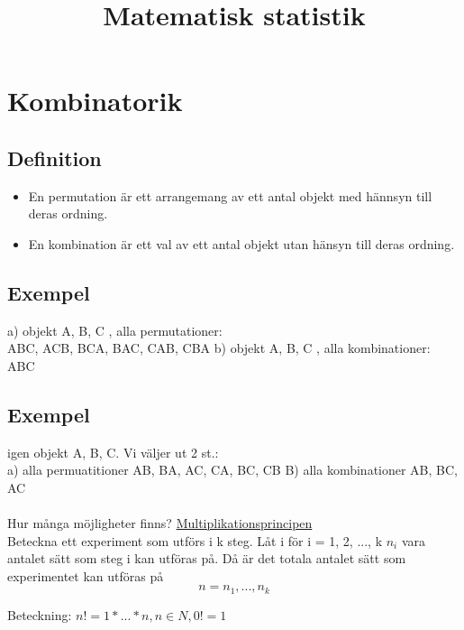 \documentclass{article}
\title{Matematisk statistik}
\begin{document}
\maketitle
\newpage
{}

\section{Kombinatorik}
\subsection{Definition}
\begin{itemize}
	\item{En permutation är ett arrangemang av ett antal objekt med hännsyn till deras ordning.}
	\item{En kombination är ett val av ett antal objekt utan hänsyn till deras ordning.}
\end{itemize}

\subsection{Exempel}
a) objekt A, B, C , alla permutationer:\\
	ABC, ACB, BCA, BAC, CAB, CBA
b) objekt A, B, C , alla kombinationer:\\
	ABC
	
\subsection{Exempel}
igen objekt A, B, C. Vi väljer ut 2 st.:\\
	a) alla permuatitioner AB, BA, AC, CA, BC, CB
	B) alla kombinationer AB, BC, AC\\
\\
Hur många möjligheter finns? \underline{Multiplikationsprincipen}\\
Beteckna ett experiment som utförs i k steg. Låt i för i = 1, 2, ..., k $n_i$ vara antalet sätt som steg i kan utföras på. Då är det totala antalet sätt som experimentet kan utföras på
\begin{equation*}
n = n_1, ..., n_k
\end{equation*}

Beteckning: $n! = 1 * ... * n, n \in N,0! = 1$
\end{document}
